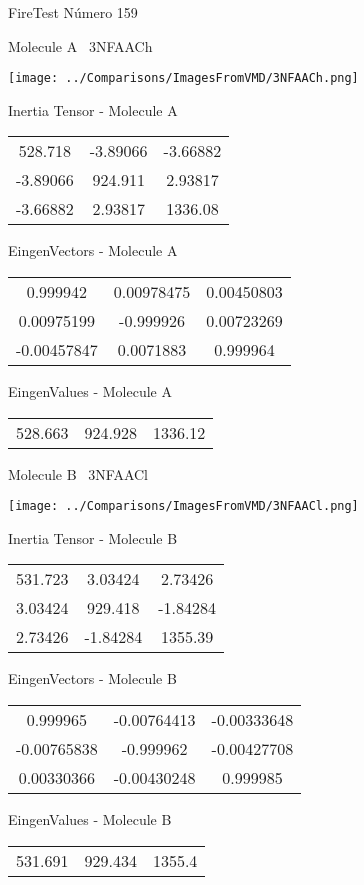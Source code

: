 \vtab[-3cm]
\begin{center}
{\large FireTest \tab Número 159}
\end{center}
\begin{multicols}{2}
\begin{center}

Molecule A \
3NFAACh

\texttt{[image: ../Comparisons/ImagesFromVMD/3NFAACh.png]}

Inertia Tensor - Molecule A \\
\begin{tabular}{|c c c|}
528.718	 & 	-3.89066	 & 	-3.66882	 \\
-3.89066	 & 	924.911	 & 	2.93817	 \\
-3.66882	 & 	2.93817	 & 	1336.08
\end{tabular}

\vtab
 EingenVectors - Molecule A     \\
\begin{tabular}{|c c c|}
0.999942	 & 	0.00978475	 & 	0.00450803	 \\
0.00975199	 & 	-0.999926	 & 	0.00723269	 \\
-0.00457847	 & 	0.0071883	 & 	0.999964
\end{tabular}

\vtab
 EingenValues - Molecule A     \\
\begin{tabular}{|c c c|}
528.663	 & 	924.928	 & 	1336.12	 \\
\end{tabular}
\columnbreak

Molecule B \
3NFAACl

\texttt{[image: ../Comparisons/ImagesFromVMD/3NFAACl.png]}

Inertia Tensor - Molecule B \\
\begin{tabular}{|c c c|}
531.723	 & 	3.03424	 & 	2.73426	 \\
3.03424	 & 	929.418	 & 	-1.84284	 \\
2.73426	 & 	-1.84284	 & 	1355.39
\end{tabular}

\vtab
 EingenVectors - Molecule B     \\
\begin{tabular}{|c c c|}
0.999965	 & 	-0.00764413	 & 	-0.00333648	 \\
-0.00765838	 & 	-0.999962	 & 	-0.00427708	 \\
0.00330366	 & 	-0.00430248	 & 	0.999985
\end{tabular}

\vtab
 EingenValues - Molecule B     \\
\begin{tabular}{|c c c|}
531.691	 & 	929.434	 & 	1355.4	 \\
\end{tabular}

\end{center}
\end{multicols}

